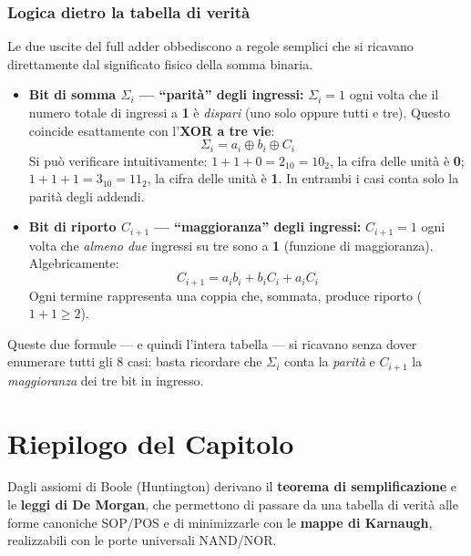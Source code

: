 \subsubsection*{Logica dietro la tabella di verità}

Le due uscite del full adder obbediscono a regole semplici che si ricavano direttamente dal significato fisico della somma binaria.

\begin{itemize}
    \item \textbf{Bit di somma $\Sigma_i$ — ``parità'' degli ingressi:}
    $\Sigma_i = 1$ ogni volta che il numero totale di ingressi a \textbf{1} è \emph{dispari} (uno solo oppure tutti e tre). Questo coincide esattamente con l'\textbf{XOR a tre vie}:
    \[
        \Sigma_i = a_i \oplus b_i \oplus C_i
    \]
    Si può verificare intuitivamente: $1+1+0 = 2_{10} = 10_2$, la cifra delle unità è \textbf{0}; $1+1+1 = 3_{10} = 11_2$, la cifra delle unità è \textbf{1}. In entrambi i casi conta solo la parità degli addendi.

    \item \textbf{Bit di riporto $C_{i+1}$ — ``maggioranza'' degli ingressi:}
    $C_{i+1} = 1$ ogni volta che \emph{almeno due} ingressi su tre sono a \textbf{1} (funzione di maggioranza). Algebricamente:
    \[
        C_{i+1} = a_i b_i + b_i C_i + a_i C_i
    \]
    Ogni termine rappresenta una coppia che, sommata, produce riporto ($1+1 \ge 2$).
\end{itemize}

Queste due formule — e quindi l'intera tabella — si ricavano senza dover enumerare tutti gli 8 casi: basta ricordare che $\Sigma_i$ conta la \emph{parità} e $C_{i+1}$ la \emph{maggioranza} dei tre bit in ingresso.

\section*{Riepilogo del Capitolo}

\begin{important}
Dagli assiomi di Boole (Huntington) derivano il \textbf{teorema di semplificazione} e le \textbf{leggi di De Morgan}, che permettono di passare da una tabella di verità alle forme canoniche SOP/POS e di minimizzarle con le \textbf{mappe di Karnaugh}, realizzabili con le porte universali NAND/NOR.
\end{important}

